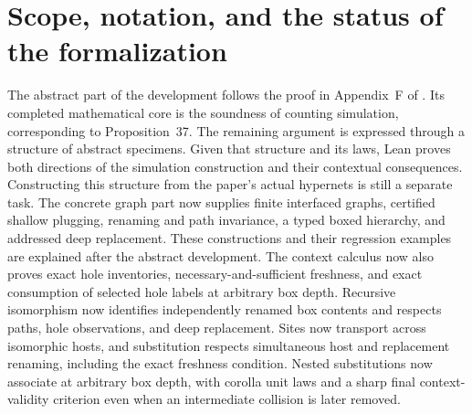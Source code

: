 \section{Scope, notation, and the status of the formalization}

The abstract part of the development follows the proof in Appendix~F of
\cite{paper}. Its completed mathematical core is the soundness of counting
simulation, corresponding to Proposition~37. The remaining argument is expressed
through a structure of abstract specimens. Given that structure and its laws,
Lean proves both directions of the simulation construction and their contextual
consequences. Constructing this structure from the paper's actual hypernets is
still a separate task. The concrete graph part now supplies finite interfaced
graphs, certified shallow plugging, renaming and path invariance, a typed boxed
hierarchy, and addressed deep replacement. These constructions and their
regression examples are explained after the abstract development. The context
calculus now also proves exact hole inventories, necessary-and-sufficient
freshness, and exact consumption of selected hole labels at arbitrary box depth.
Recursive isomorphism now identifies independently renamed box contents and
respects paths, hole observations, and deep replacement. Sites now transport across
isomorphic hosts, and substitution respects simultaneous host and replacement
renaming, including the exact freshness condition. Nested substitutions now
associate at arbitrary box depth, with corolla unit laws and a sharp final
context-validity criterion even when an intermediate collision is later removed.


